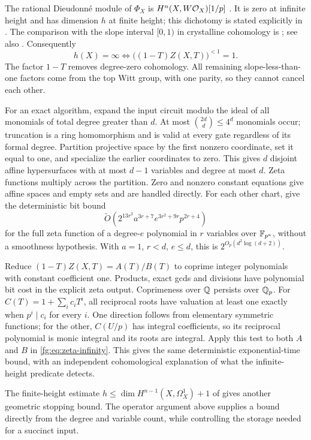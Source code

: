 The rational Dieudonn\'e module of $\Phi_X$ is
$H^n(X,W\mathcal O_X)[1/p]$
\citep[II, Corollary~4.3, p.~110]{fg-artin-mazur}.
It is zero at infinite height and has dimension $h$ at finite height;
this dichotomy is stated explicitly in
\citet[\S3, p.~6 of the preprint]{fg-yobuko}.
The comparison with the slope interval $[0,1)$ in crystalline cohomology
is \citet[II, Corollary~3.5, (3.5.3), p.~616]{fg-illusie}; see also
\citet[Theorem~1.1 and (6.2)]{fg-bbe}. Consequently
\begin{equation}\label{fg:eq:zeta-infinity}
 h(X)=\infty\iff\bigl((1-T)Z(X,T)\bigr)^{<1}=1.
\end{equation}
The factor $1-T$ removes degree-zero cohomology. All remaining
slope-less-than-one factors come from the top Witt group, with one
parity, so they cannot cancel each other.

For an exact algorithm, expand the input circuit modulo the ideal of
all monomials of total degree greater than $d$. At most
$\binom{2d}{d}\le4^d$ monomials occur; truncation is a ring
homomorphism and is valid at every gate regardless of its formal
degree. Partition projective space by the first nonzero coordinate,
set it equal to one, and specialize the earlier coordinates to zero.
This gives $d$ disjoint affine hypersurfaces with at most $d-1$
variables and degree at most $d$. Zeta functions multiply across the
partition. Zero and nonzero constant equations give affine spaces and
empty sets and are handled directly. For each other chart,
\citet[Theorem~37, p.~29 of the preprint]{ff-lauder-wan} give the
deterministic bit bound
\[
 \widetilde O\left(2^{13r^2}a^{3r+7}
                   e^{3r^2+9r}p^{2r+4}\right)
\]
for the full zeta function of a degree-$e$ polynomial in $r$ variables
over $\mathbb F_{p^a}$, without a smoothness hypothesis. With $a=1$, $r<d$,
$e\le d$, this is $2^{O_p(d^2\log(d+2))}$.

Reduce $(1-T)Z(X,T)=A(T)/B(T)$ to coprime integer polynomials with
constant coefficient one. Products, exact gcds and divisions have
polynomial bit cost in the explicit zeta output. Coprimeness over
$\mathbb Q$ persists over $\mathbb Q_p$. For
$C(T)=1+\sum_i c_iT^i$, all reciprocal roots have valuation at least
one exactly when $p^i\mid c_i$ for every $i$. One direction follows
from elementary symmetric functions; for the other, $C(U/p)$ has
integral coefficients, so its reciprocal polynomial is monic integral
and its roots are integral. Apply this test to both $A$ and $B$ in
\eqref{fg:eq:zeta-infinity}. This gives the same deterministic
exponential-time bound, with an independent cohomological explanation
of what the infinite-height predicate detects.

The finite-height estimate
$h\le\dim H^{n-1}(X,\Omega_X^1)+1$ of
\citet[Corollary~2.3, p.~100]{fg-vdgk} gives another geometric stopping
bound. The operator argument above supplies a bound directly from the
degree and variable count, while controlling the storage needed for a
succinct input.
